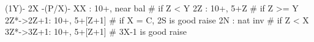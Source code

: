 (1Y)- 2X -(P/X)-
 XX : 10+, near bal
# if Z < Y
 2Z : 10+, 5+Z
# if Z >= Y
 2Z*->2Z+1: 10+, 5+[Z+1]  # if X = C, 2S is good raise
 2N : nat inv
# if Z < X
 3Z*->3Z+1: 10+, 5+[Z+1]  # 3X-1 is good raise